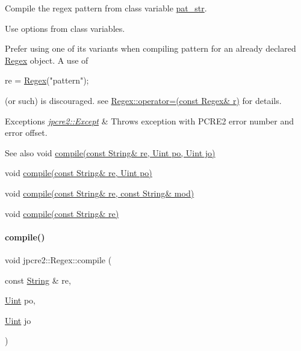 Compile the regex pattern from class variable \hyperlink{classjpcre2_1_1Regex_a0bceb85b6dbba355b56b5cc312214435}{pat\+\_\+str}. 

Use options from class variables.

Prefer using one of its variants when compiling pattern for an already declared \hyperlink{classjpcre2_1_1Regex}{Regex} object. A use of 
\begin{DoxyCode}
re = \hyperlink{classjpcre2_1_1Regex_a302f65cd5747c5d34570ca76516ab715_a302f65cd5747c5d34570ca76516ab715}{Regex}(\textcolor{stringliteral}{"pattern"});
\end{DoxyCode}
 (or such) is discouraged. see {\ttfamily \hyperlink{classjpcre2_1_1Regex_ab43a14b4b6e75b7fa3221bc18a1d4121_ab43a14b4b6e75b7fa3221bc18a1d4121}{Regex\+::operator=(const Regex\& r)}} for details. 
\begin{DoxyExceptions}{Exceptions}
{\em \hyperlink{classjpcre2_1_1Except}{jpcre2\+::\+Except}} & Throws exception with P\+C\+R\+E2 error number and error offset. \\
\hline
\end{DoxyExceptions}
\begin{DoxySeeAlso}{See also}
void \hyperlink{classjpcre2_1_1Regex_a4640915bc907aa3b80da543f1eb7e74f_a4640915bc907aa3b80da543f1eb7e74f}{compile(const String\& re, Uint po, Uint jo)} 

void \hyperlink{classjpcre2_1_1Regex_a01394dcb222c4d442cabbffb4bcf570a_a01394dcb222c4d442cabbffb4bcf570a}{compile(const String\& re, Uint po)} 

void \hyperlink{classjpcre2_1_1Regex_acd49e856009160c622e90b81b6557d8d_acd49e856009160c622e90b81b6557d8d}{compile(const String\& re, const String\& mod)} 

void \hyperlink{classjpcre2_1_1Regex_a81687ca434654cae776c2854c3618de0_a81687ca434654cae776c2854c3618de0}{compile(const String\& re)} 
\end{DoxySeeAlso}
\hypertarget{classjpcre2_1_1Regex_a4640915bc907aa3b80da543f1eb7e74f_a4640915bc907aa3b80da543f1eb7e74f}{}\label{classjpcre2_1_1Regex_a4640915bc907aa3b80da543f1eb7e74f_a4640915bc907aa3b80da543f1eb7e74f} 
\paragraph{\texorpdfstring{compile()}{compile()}\hspace{0.1cm}{\footnotesize\ttfamily [2/5]}}
{\footnotesize\ttfamily void jpcre2\+::\+Regex\+::compile (\begin{DoxyParamCaption}\item[{const \hyperlink{namespacejpcre2_a91f03070152fb228bc116c5a737f1d16}{String} \&}]{re,  }\item[{\hyperlink{namespacejpcre2_a078242d38221a13fb3543b9edd78c099}{Uint}}]{po,  }\item[{\hyperlink{namespacejpcre2_a078242d38221a13fb3543b9edd78c099}{Uint}}]{jo }\end{DoxyParamCaption})\hspace{0.3cm}{\ttfamily [inline]}}



